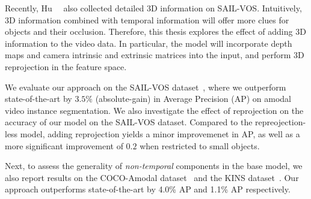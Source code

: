 Recently, Hu~\etal~\cite{HuCVPR2021} also collected detailed 3D information on SAIL-VOS. Intuitively, 3D information combined with temporal information will offer more clues for objects and their occlusion. Therefore, this thesis explores the effect of adding 3D information to the video data.  In particular, the model will incorporate depth maps and camera intrinsic and extrinsic matrices into the input, and perform 3D reprojection in the feature space.


We evaluate our approach on the SAIL-VOS dataset~\cite{hu2019sail}, where we outperform state-of-the-art by $3.5\%$ (absolute-gain) in Average Precision (AP) on amodal video instance segmentation. 
We also investigate the effect of reprojection on the accuracy of our model on the SAIL-VOS dataset. Compared to the repreojection-less 
model, adding reprojection yields a minor improvemenet in AP, as well as a more significant improvement of $0.2$ when restricted to small 
objects.

Next, to assess the generality of \textit{non-temporal} components in the base model,
we also report results on the COCO-Amodal dataset~\cite{zhu2017semantic} and the KINS dataset~\cite{qi2019amodal}.
Our approach outperforms state-of-the-art by 4.0\% AP and 1.1\% AP respectively.
